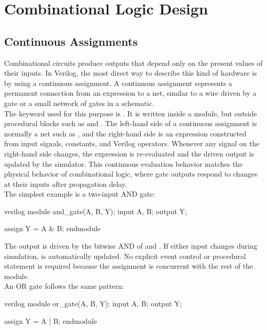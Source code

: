 \chapter{Combinational Logic Design}

\section{Continuous Assignments}
Combinational circuits produce outputs that depend only on the present values of their inputs. In
Verilog, the most direct way to describe this kind of hardware is by using a continuous assignment.
A continuous assignment represents a permanent connection from an expression to a net, similar to a
wire driven by a gate or a small network of gates in a schematic.\\

\noindent The keyword used for this purpose is . It is written inside a module,
but outside procedural blocks such as  and . The left-hand
side of a continuous assignment is normally a net such as , and the right-hand side
is an expression constructed from input signals, constants, and Verilog operators. Whenever any
signal on the right-hand side changes, the expression is re-evaluated and the driven output is
updated by the simulator. This continuous evaluation behavior matches the physical behavior of
combinational logic, where gate outputs respond to changes at their inputs after propagation delay.\\

\noindent The simplest example is a two-input AND gate:

\begin{codeblock}{verilog}
module and_gate(A, B, Y);
    input A, B;
    output Y;

    assign Y = A & B;
endmodule
\end{codeblock}

\noindent The output  is driven by the bitwise AND of  and
. If either input changes during simulation,  is automatically updated.
No explicit event control or procedural statement is required because the assignment is concurrent
with the rest of the module.\\

\noindent An OR gate follows the same pattern:

\begin{codeblock}{verilog}
module or_gate(A, B, Y);
    input A, B;
    output Y;

    assign Y = A | B;
endmodule
\end{codeblock}

